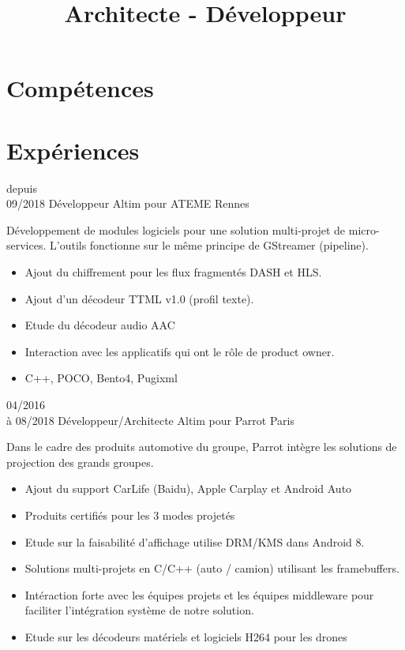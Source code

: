 \documentclass[10pt,a4paper]{moderncv}       %
\title{Architecte - Développeur}
\begin{document}
\maketitle

\section{Compétences}

\vspace*{5mm}
\section{Expériences}
\cventry
{depuis\\09/2018}   %
{Développeur}       %
{Altim pour ATEME}  %
{Rennes}            %
{}                  %
{
Développement de modules logiciels pour une solution multi-projet de micro-services.
L'outils fonctionne sur le même principe de GStreamer (pipeline).
\begin{itemize}
\setlength{\itemindent}{2mm}
  \item Ajout du chiffrement pour les flux fragmentés DASH et HLS.
  \item Ajout d'un décodeur TTML v1.0 (profil texte).
  \item Etude du décodeur audio AAC
  \item Interaction avec les applicatifs qui ont le rôle de product owner.
  \item C++, POCO, Bento4, Pugixml
\end{itemize}
}
\vspace*{3mm}
\cventry
{04/2016\\à 08/2018}%
{Développeur/Architecte}       %
{Altim pour Parrot} %
{Paris}             %
{}                  %
{
Dans le cadre des produits automotive du groupe, Parrot intègre les solutions de
projection des grands groupes.
\begin{itemize}
\setlength{\itemindent}{2mm}
  \item Ajout du support CarLife (Baidu), Apple Carplay et Android Auto
  \item Produits certifiés pour les 3 modes projetés
  \item Etude sur la faisabilité d'affichage utilise DRM/KMS dans Android 8.
  \item Solutions multi-projets en C/C++ (auto / camion) utilisant les framebuffers.
  \item Intéraction forte avec les équipes projets et les équipes middleware
  pour faciliter l'intégration système de notre solution.
  \item Etude sur les décodeurs matériels et logiciels H264 pour les drones
\end{itemize}
}
\end{document}
